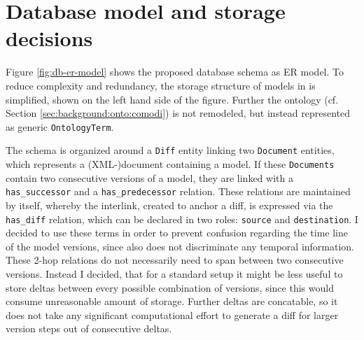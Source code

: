 \section{Database model and storage decisions}
\label{sec:concept:dbmodel}

Figure \ref{fig:db-er-model} shows the proposed database schema as ER model. To reduce complexity and redundancy, the storage structure of models in \masymos is simplified, shown on the left hand side of the figure. Further the \comodi ontology (cf. Section \ref{sec:background:onto:comodi}) is not remodeled, but instead represented as generic \texttt{OntologyTerm}.


The schema is organized around a \texttt{Diff} entity linking two \texttt{Document} entities, which represents a (XML-)document containing a model. If these \texttt{Documents} contain two consecutive versions of a model, they are linked with a \texttt{has\_successor} and a \texttt{has\_predecessor} relation. These relations are maintained by \masymos itself, whereby the interlink, created to anchor a diff, is expressed via the \texttt{has\_diff} relation, which can be declared in two roles: \texttt{source} and \texttt{destination}. I decided to use these terms in order to prevent confusion regarding the time line of the model versions, since \bives also does not discriminate any temporal information.
These 2-hop relations do not necessarily need to span between two consecutive versions.
Instead I decided, that for a standard setup it might be less useful to store deltas between every possible combination of versions, since this would consume unreasonable amount of storage.
Further deltas are concatable, so it does not take any significant computational effort to generate a diff for larger version steps out of consecutive deltas.


